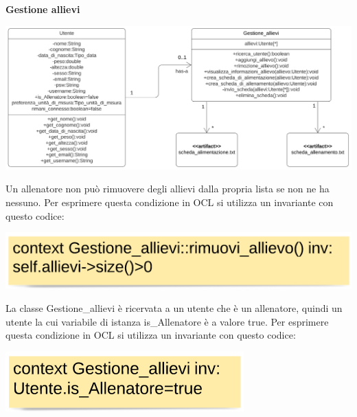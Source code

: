 \documentclass{article}
\begin{document}
    
    {\large\textbf{Gestione allievi}}\\
    
    \begin{center}
            \includegraphics[scale=0.5]{classi/Gestione_allievi.png}
    \end{center}
    \hfill \break
    
    Un allenatore non può rimuovere degli allievi dalla propria lista se non ne ha nessuno. Per esprimere questa condizione in OCL si utilizza un invariante con questo codice:\\
    
    
    
    \begin{center}
            \includegraphics[scale=0.5]{OCL/Gestione allievi 1.png}
    \end{center}
    \hfill \break
    
    La classe Gestione\_allievi è ricervata a un utente che è un allenatore, quindi un utente la cui variabile di istanza is\_Allenatore è a valore true. Per esprimere questa condizione in OCL si utilizza un invariante con questo codice:\\
    
    
    \begin{center}
            \includegraphics[scale=0.5]{OCL/Gestione allievi 2.png}
    \end{center}
    \hfill \break
    
\end{document}
